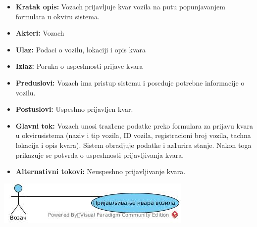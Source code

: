\begin{itemize}
\item{\textbf{Kratak opis:} Vozach prijavljuje kvar vozila na putu popunjavanjem formulara u okviru sistema.}
\item{\textbf{Akteri:} Vozach}
\item{\textbf{Ulaz:} Podaci o vozilu, lokaciji i opis kvara }
\item{\textbf{Izlaz:} Poruka o uspeshnosti prijave kvara }
\item{\textbf{Preduslovi:} Vozach ima pristup sistemu i poseduje potrebne informacije o vozilu. }
\item{\textbf{Postuslovi:} Uspeshno prijavljen kvar.}
\item{\textbf{Glavni tok:} Vozach unosi traz1ene podatke preko formulara za prijavu kvara u okvirusistema (naziv i tip vozila, ID vozila, registracioni broj vozila, tachna lokacija i opis kvara). Sistem obradjuje podatke i az1urira stanje. Nakon toga prikazuje se potvrda o uspeshnosti prijavljivanja kvara. }
\item{\textbf{Alternativni tokovi:} Neuspeshno prijavljivanje kvara.}
\end{itemize}
\includegraphics{Slike/SUodrzavanje.jpg}